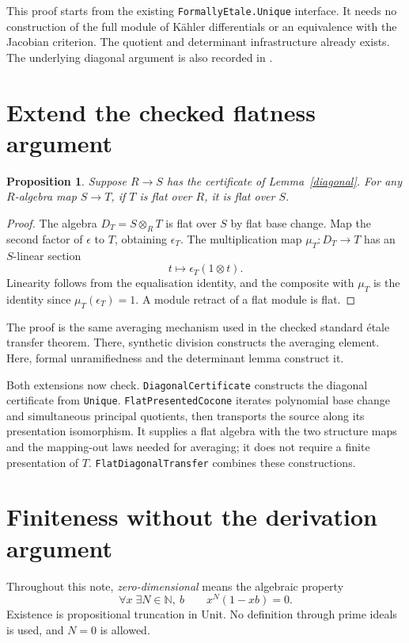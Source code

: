 \documentclass[11pt]{article}
\newtheorem{proposition}{Proposition}
\begin{document}
This proof starts from the existing \texttt{FormallyEtale.Unique}
interface.  It needs no construction of the full module of
K\"ahler differentials or an equivalence with the Jacobian criterion.
The quotient and determinant infrastructure already exists.  The
underlying diagonal argument is also recorded in \cite{diagonal}.

\section{Extend the checked flatness argument}

\begin{proposition}\label{transfer}
Suppose $R\to S$ has the certificate of Lemma~\ref{diagonal}.
For any $R$-algebra map $S\to T$, if $T$ is flat over $R$, it is flat
over $S$.
\end{proposition}
\begin{proof}
The algebra $D_T=S\otimes_R T$ is flat over $S$ by flat base change.
Map the second factor of $\epsilon$ to $T$, obtaining $\epsilon_T$.
The multiplication map $\mu_T:D_T\to T$ has an $S$-linear section
\[
 t\longmapsto\epsilon_T(1\otimes t).
\]
Linearity follows from the equalisation identity, and the composite
with $\mu_T$ is the identity since $\mu_T(\epsilon_T)=1$.
A module retract of a flat module is flat.
\end{proof}

The proof is the same averaging mechanism used in the checked standard
\'etale transfer theorem.  There, synthetic division constructs the
averaging element.  Here, formal unramifiedness and the determinant
lemma construct it.

Both extensions now check.  \texttt{DiagonalCertificate} constructs
the diagonal certificate from \texttt{Unique}.
\texttt{FlatPresentedCocone} iterates polynomial base change and
simultaneous principal quotients, then transports the source along
its presentation isomorphism.  It supplies a flat algebra with the two
structure maps and the mapping-out laws needed for averaging; it does
not require a finite presentation of $T$.
\texttt{FlatDiagonalTransfer} combines these constructions.

\section{Finiteness without the derivation argument}

Throughout this note, \emph{zero-dimensional} means the algebraic
property
\[
 \forall x\;\exists N\in\mathbb N,\ b\qquad x^N(1-xb)=0.
\]
Existence is propositional truncation in Unit.  No definition through
prime ideals is used, and $N=0$ is allowed.
\end{document}
